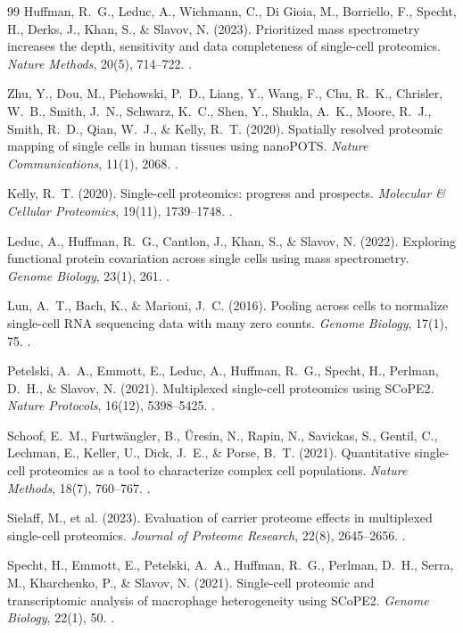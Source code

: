 \documentclass[11pt,twoside,openright]{book}
\begin{document}
\begin{thebibliography}{99}
Huffman, R.~G., Leduc, A., Wichmann, C., Di Gioia, M., Borriello, F., Specht, H., Derks, J., Khan, S., \& Slavov, N. (2023). Prioritized mass spectrometry increases the depth, sensitivity and data completeness of single-cell proteomics. \textit{Nature Methods}, 20(5), 714--722. .

Zhu, Y., Dou, M., Piehowski, P.~D., Liang, Y., Wang, F., Chu, R.~K., Chrisler, W.~B., Smith, J.~N., Schwarz, K.~C., Shen, Y., Shukla, A.~K., Moore, R.~J., Smith, R.~D., Qian, W.~J., \& Kelly, R.~T. (2020). Spatially resolved proteomic mapping of single cells in human tissues using nanoPOTS. \textit{Nature Communications}, 11(1), 2068. .

Kelly, R.~T. (2020). Single-cell proteomics: progress and prospects. \textit{Molecular \& Cellular Proteomics}, 19(11), 1739--1748. .

Leduc, A., Huffman, R.~G., Cantlon, J., Khan, S., \& Slavov, N. (2022). Exploring functional protein covariation across single cells using mass spectrometry. \textit{Genome Biology}, 23(1), 261. .

Lun, A.~T., Bach, K., \& Marioni, J.~C. (2016). Pooling across cells to normalize single-cell RNA sequencing data with many zero counts. \textit{Genome Biology}, 17(1), 75. .

Petelski, A.~A., Emmott, E., Leduc, A., Huffman, R.~G., Specht, H., Perlman, D.~H., \& Slavov, N. (2021). Multiplexed single-cell proteomics using SCoPE2. \textit{Nature Protocols}, 16(12), 5398--5425. .

Schoof, E.~M., Furtw\"angler, B., \"Uresin, N., Rapin, N., Savickas, S., Gentil, C., Lechman, E., Keller, U., Dick, J.~E., \& Porse, B.~T. (2021). Quantitative single-cell proteomics as a tool to characterize complex cell populations. \textit{Nature Methods}, 18(7), 760--767. .

Sielaff, M., et al. (2023). Evaluation of carrier proteome effects in multiplexed single-cell proteomics. \textit{Journal of Proteome Research}, 22(8), 2645--2656. .

Specht, H., Emmott, E., Petelski, A.~A., Huffman, R.~G., Perlman, D.~H., Serra, M., Kharchenko, P., \& Slavov, N. (2021). Single-cell proteomic and transcriptomic analysis of macrophage heterogeneity using SCoPE2. \textit{Genome Biology}, 22(1), 50. .


\end{thebibliography}
\end{document}

